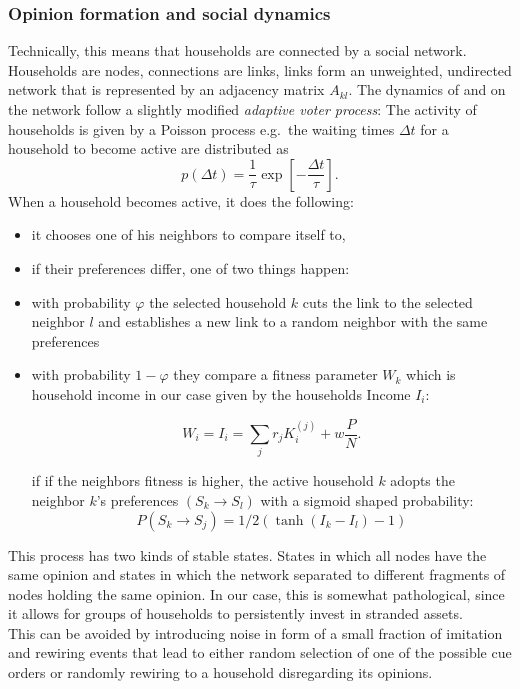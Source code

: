 \subsubsection{Opinion formation and social dynamics}
Technically, this means that households are connected by a social network. Households are nodes, connections are links, links form an unweighted, undirected network that is represented by an adjacency matrix $A_{kl}$.
The dynamics of and on the network follow a slightly modified \textit{adaptive voter process}:
The activity of households is given by a Poisson process e.g.\ the waiting times $\Delta t$ for a household to become active are distributed as
\begin{equation}
	p(\Delta t) = \frac{1}{\tau} \exp\left[-\frac{\Delta t}{\tau} \right].
	\label{waiting_time_distribution}
\end{equation}
When a household becomes active, it does the following:
\begin{itemize}
	\item it chooses one of his neighbors to compare itself to,
	\item if their preferences differ, one of two things happen:
	\item with probability $\varphi$ the selected household $k$ cuts
		the link to the selected neighbor $l$ and establishes a new
		link to a random neighbor with the same preferences
	\item with probability $1-\varphi$ they compare a fitness parameter $W_k$
		which is household income in our case given by the households Income $I_i$: 

		\begin{equation}
			W_i = I_i = \sum_j r_j K^{(j)}_{i} + w\frac{P}{N}.
			\label{eq:fitness}
		\end{equation}

		if if the neighbors fitness is higher, the active household $k$
		adopts the neighbor $k$'s preferences $(S_k \rightarrow S_l)$ with a sigmoid shaped 
		probability:
		\begin{equation}
			P(S_k \rightarrow S_j) = 1/2 (\tanh(I_k - I_l)-1)
			\label{imitation_probability}
		\end{equation}
\end{itemize}

This process has two kinds of stable states. States in which all nodes have the same opinion and states in which the network separated to different fragments of nodes holding the same opinion. In our case, this is somewhat pathological, since it allows for groups of households to persistently invest in stranded assets. \\
This can be avoided by introducing noise in form of a small fraction of imitation and rewiring events that lead to either random selection of one of the possible cue orders or randomly rewiring to a household disregarding its opinions.

